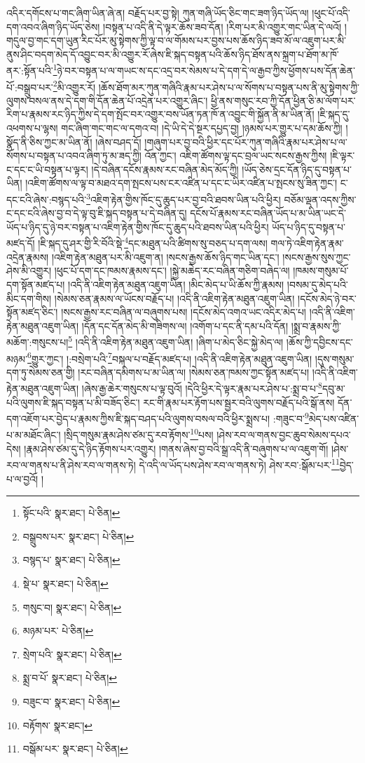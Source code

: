 འདིར་དགོངས་པ་གང་ཞིག་ཡིན་ཞེ་ན། བརྗོད་པར་བྱ་སྟེ། ཀུན་གཞི་ཡོད་ཅིང་གང་ཟག་ཉིད་ཡོད་ལ། །ཕུང་པོ་འདི་དག་འབའ་ཞིག་ཉིད་ཡོད་ཅེས། །བསྟན་པ་འདི་ནི་དེ་ལྟར་ཆོས་ཟབ་དོན། །རིག་པར་མི་འགྱུར་གང་ཡིན་དེ་ལའོ། །གདུལ་བྱ་གང་དག་ཡུན་རིང་པོར་མུ་སྟེགས་ཀྱི་ལྟ་བ་ལ་གོམས་པར་བྱས་པས་ཆོས་ཉིད་ཟབ་མོ་ལ་འཇུག་པར་མི་ནུས་ཤིང་བདག་མེད་དོ་འབྱུང་བར་མི་འགྱུར་རོ་ཞེས་ཇི་སྐད་བསྟན་པའི་ཆོས་ཉིད་ཐོས་ནས་སྐྲག་པ་ཐོག་མ་ཁོ་ནར་:སྟོན་པའི་\footnote{སྟོང་པའི་  སྣར་ཐང་།  པེ་ཅིན། }ཉེ་བར་བསྟན་པ་ལ་གཡང་ས་དང་འདྲ་བར་སེམས་པ་དེ་དག་དེ་ལ་རྒྱབ་ཀྱིས་ཕྱོགས་པས་དོན་ཆེན་པོ་:བསྒྲུབ་པར་\footnote{བསྒྲུབས་པར་  སྣར་ཐང་།  པེ་ཅིན། }མི་འགྱུར་རོ། །ཆོས་ཐོག་མར་ཀུན་གཞིའི་རྣམ་པར་ཤེས་པ་ལ་སོགས་པ་བསྟན་པས་ནི་མུ་སྟེགས་ཀྱི་ལུགས་བསལ་ནས་དེ་དག་གི་དོན་ཆེན་པོ་འདྲེན་པར་འགྱུར་ཞིང་། ཕྱི་ནས་གསུང་རབ་ཀྱི་དོན་ཕྱིན་ཅི་མ་ལོག་པར་རིག་པ་རྣམས་རང་ཉིད་ཀྱིས་དེ་དག་སྤོང་བར་འགྱུར་བས་ཡོན་ཏན་ཁོ་ན་འབྱུང་གི་སྐྱོན་ནི་མ་ཡིན་ནོ། །ཇི་སྐད་དུ་འཕགས་པ་ལྷས། གང་ཞིག་གང་གང་ལ་དགའ་བ། །དེ་ཡི་དེ་དེ་སྔར་དཔྱད་བྱ། །ཉམས་པར་གྱུར་པ་དམ་ཆོས་ཀྱི། །སྣོད་ནི་ཅིས་ཀྱང་མ་ཡིན་ནོ། །ཞེས་བཤད་དོ། །གཞུག་པར་བྱ་བའི་ཕྱིར་དང་པོར་ཀུན་གཞིའི་རྣམ་པར་ཤེས་པ་ལ་སོགས་པ་བསྟན་པ་འབའ་ཞིག་ཏུ་མ་ཟད་ཀྱི། འོན་ཀྱང་། འཇིག་ཚོགས་ལྟ་དང་བྲལ་ཡང་སངས་རྒྱས་ཀྱིས། །ཇི་ལྟར་ང་དང་ང་ཡི་བསྟན་པ་ལྟར། །དེ་བཞིན་དངོས་རྣམས་རང་བཞིན་མེད་མོད་ཀྱི། །ཡོད་ཅེས་དྲང་དོན་ཉིད་དུ་བསྟན་པ་ཡིན། །འཇིག་ཚོགས་ལ་ལྟ་བ་མཐའ་དག་སྤངས་པས་ངར་འཛིན་པ་དང་ང་ཡིར་འཛིན་པ་སྤངས་སུ་ཟིན་ཀྱང་། ང་དང་ངའི་ཞེས་:བསྙད་པའི་\footnote{བསྙད་པ་  སྣར་ཐང་།  པེ་ཅིན། }འཇིག་རྟེན་གྱིས་ཁོང་དུ་ཆུད་པར་བྱ་བའི་ཐབས་ཡིན་པའི་ཕྱིར། བཅོམ་ལྡན་འདས་ཀྱིས་ང་དང་ངའི་ཞེས་བྱ་བ་དེ་ལྟ་བུ་ཇི་སྐད་བསྟན་པ་དེ་བཞིན་དུ། དངོས་པོ་རྣམས་རང་བཞིན་ཡོད་པ་མ་ཡིན་ཡང་དེ་ཡོད་པ་ཉིད་དུ་ཉེ་བར་བསྟན་པ་འཇིག་རྟེན་གྱིས་ཁོང་དུ་ཆུད་པའི་ཐབས་ཡིན་པའི་ཕྱིར། ཡོད་པ་ཉིད་དུ་བསྟན་པ་མཛད་དོ། །ཇི་སྐད་དུ་ཤར་གྱི་རི་བོའི་སྡེ་\footnote{སྡེ་པ་  སྣར་ཐང་།  པེ་ཅིན། }དང་མཐུན་པའི་ཚིགས་སུ་བཅད་པ་དག་ལས། གལ་ཏེ་འཇིག་རྟེན་རྣམ་འདྲེན་རྣམས། །འཇིག་རྟེན་མཐུན་པར་མི་འཇུག་ན། །སངས་རྒྱས་ཆོས་ཉིད་གང་ཡིན་དང་། །སངས་རྒྱས་སུས་ཀྱང་ཤེས་མི་འགྱུར། །ཕུང་པོ་དག་དང་ཁམས་རྣམས་དང་། །སྐྱེ་མཆེད་རང་བཞིན་གཅིག་བཞེད་ལ། །ཁམས་གསུམ་པོ་དག་སྟོན་མཛད་པ། །འདི་ནི་འཇིག་རྟེན་མཐུན་འཇུག་ཡིན། །མིང་མེད་པ་ཡི་ཆོས་ཀྱི་རྣམས། །བསམ་དུ་མེད་པའི་མིང་དག་གིས། །སེམས་ཅན་རྣམས་ལ་ཡོངས་བརྗོད་པ། །འདི་ནི་འཇིག་རྟེན་མཐུན་འཇུག་ཡིན། །དངོས་མེད་ཉེ་བར་སྟོན་མཛད་ཅིང་། །སངས་རྒྱས་རང་བཞིན་ལ་བཞུགས་པས། །དངོས་མེད་འགའ་ཡང་འདིར་མེད་པ། །འདི་ནི་འཇིག་རྟེན་མཐུན་འཇུག་ཡིན། །དོན་དང་དོན་མེད་མི་གཟིགས་ལ། །འགོག་པ་དང་ནི་དམ་པའི་དོན། །སྨྲ་བ་རྣམས་ཀྱི་མཆོག་:གསུངས་པ།\footnote{གསུང་བ།  སྣར་ཐང་།  པེ་ཅིན། } །འདི་ནི་འཇིག་རྟེན་མཐུན་འཇུག་ཡིན། །ཞིག་པ་མེད་ཅིང་སྐྱེ་མེད་ལ། །ཆོས་ཀྱི་དབྱིངས་དང་མཉམ་\footnote{མཉམ་པར་  པེ་ཅིན། }གྱུར་ཀྱང་། །:བསྲེག་པའི་\footnote{སྲེག་པའི་  སྣར་ཐང་།  པེ་ཅིན། }བསྐལ་པ་བརྗོད་མཛད་པ། །འདི་ནི་འཇིག་རྟེན་མཐུན་འཇུག་ཡིན། །དུས་གསུམ་དག་ཏུ་སེམས་ཅན་གྱི། །རང་བཞིན་དམིགས་པ་མ་ཡིན་ལ། །སེམས་ཅན་ཁམས་ཀྱང་སྟོན་མཛད་པ། །འདི་ནི་འཇིག་རྟེན་མཐུན་འཇུག་ཡིན། །ཞེས་རྒྱ་ཆེར་གསུངས་པ་ལྟ་བུའོ། །དེའི་ཕྱིར་དེ་ལྟར་རྣམ་པར་ཤེས་པ་:སྨྲ་བ་པ་\footnote{སྨྲ་བ་པོ་  སྣར་ཐང་།  པེ་ཅིན། }དབུ་མ་པའི་ལུགས་ཇི་སྐད་བསྟན་པ་མི་བཟོད་ཅིང་། རང་གི་རྣམ་པར་རྟོག་པས་སྦྱར་བའི་ལུགས་བརྗོད་པའི་སྒོ་ནས། དོན་དག་འཇོག་པར་བྱེད་པ་རྣམས་ཀྱིས་ཇི་སྐད་བཤད་པའི་ལུགས་བསལ་བའི་ཕྱིར་སྨྲས་པ། :གཟུང་བ་\footnote{བཟུང་བ་  སྣར་ཐང་།  པེ་ཅིན། }མེད་པས་འཛིན་པ་མ་མཐོང་ཞིང་། །སྲིད་གསུམ་རྣམ་ཤེས་ཙམ་དུ་རབ་རྟོགས་\footnote{བརྟོགས་  སྣར་ཐང་། }པས། །ཤེས་རབ་ལ་གནས་བྱང་ཆུབ་སེམས་དཔའ་དེས། །རྣམ་ཤེས་ཙམ་དུ་དེ་ཉིད་རྟོགས་པར་འགྱུར། །གནས་ཞེས་བྱ་བའི་སྒྲ་འདི་ནི་བཞུགས་པ་ལ་འཇུག་གོ། །ཤེས་རབ་ལ་གནས་པ་ནི་ཤེས་རབ་ལ་གནས་ཏེ། དེ་འདི་ལ་ཡོད་པས་ཤེས་རབ་ལ་གནས་ཏེ། ཤེས་རབ་:སྒོམ་པར་\footnote{བསྒོམ་པར་  སྣར་ཐང་།  པེ་ཅིན། }བྱེད་པ་ལ་བྱའོ། །
